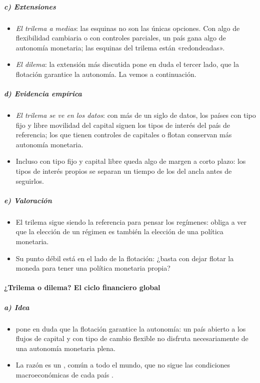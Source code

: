 \documentclass[11pt]{article}
\begin{document}
\subparagraph{c) Extensiones}

\begin{itemize}
\item \emph{El trilema a medias}: las esquinas no son las únicas opciones. Con algo de flexibilidad cambiaria o con controles parciales, un país gana algo de autonomía monetaria; las esquinas del trilema están «redondeadas»\nocite{KleinShambaugh2015}.
\item \emph{El dilema}: la extensión más discutida pone en duda el tercer lado, que la flotación garantice la autonomía\nocite{Rey2013Dilema}. La vemos a continuación.
\end{itemize}

\subparagraph{d) Evidencia empírica}

\begin{itemize}
\item \emph{El trilema se ve en los datos}: con más de un siglo de datos, los países con tipo fijo y libre movilidad del capital siguen los tipos de interés del país de referencia; los que tienen controles de capitales o flotan conservan más autonomía monetaria\nocite{ObstfeldShambaughTaylor2005}.
\item Incluso con tipo fijo y capital libre queda algo de margen a corto plazo: los tipos de interés propios se separan un tiempo de los del ancla antes de seguirlos\nocite{KleinShambaugh2015}.
\end{itemize}

\subparagraph{e) Valoración}

\begin{itemize}
\item El trilema sigue siendo la referencia para pensar los regímenes: obliga a ver que la elección de un régimen es también la elección de una política monetaria.
\item Su punto débil está en el lado de la flotación: ¿basta con dejar flotar la moneda para tener una política monetaria propia?
\end{itemize}

\paragraph{¿Trilema o dilema? El ciclo financiero global}\label{sec:dilema}

\subparagraph{a) Idea}

\begin{itemize}
\item \textcite{Rey2013Dilema} pone en duda que la flotación garantice la autonomía: un país abierto a los flujos de capital y con tipo de cambio flexible no disfruta necesariamente de una autonomía monetaria plena.
\item La razón es un , común a todo el mundo, que no sigue las condiciones macroeconómicas de cada país  .
\end{itemize}
\end{document}
